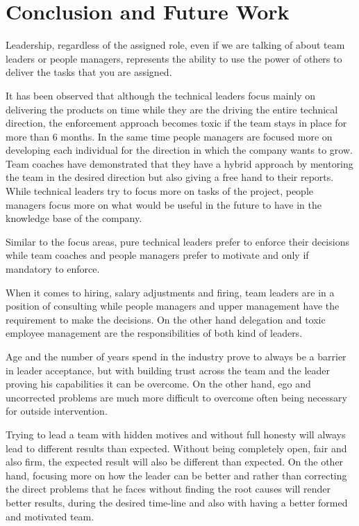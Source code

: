 \chapter{Conclusion and Future Work}
\label{sec:con-fut}

Leadership, regardless of the assigned role, even if we are talking of about team leaders or people managers, represents the ability to use the power of others to deliver the tasks that you are assigned. 

It has been observed that although the technical leaders focus mainly on delivering the products on time while they are the driving the entire technical direction, the enforcement approach becomes toxic if the team stays in place for more than 6 months. In the same time people managers are focused more on developing each individual for the direction in which the company wants to grow. Team coaches have demonstrated that they have a hybrid approach by mentoring the team in the desired direction but also giving a free hand to their reports. While technical leaders try to focus more on tasks of the project, people managers focus more on what would be useful in the future to have in the knowledge base of the company.

Similar to the focus areas, pure technical leaders prefer to enforce their decisions while team coaches and people managers prefer to motivate and only if mandatory to enforce.

When it comes to hiring, salary adjustments and firing, team leaders are in a position of consulting while people managers and upper management have the requirement to make the decisions. On the other hand delegation and toxic employee management are the responsibilities of both kind of leaders.

Age and the number of years spend in the industry prove to always be a barrier in leader acceptance, but with building trust across the team and the leader proving his capabilities it can be overcome. On the other hand, ego and uncorrected problems are much more difficult to overcome often being necessary for outside intervention.

Trying to lead a team with hidden motives and without full honesty will always lead to different results than expected. Without being completely open, fair and also firm, the expected result will also be different than expected. On the other hand, focusing more on how the leader can be better and rather than correcting the direct problems that he faces without finding the root causes will render better results, during the desired time-line and also with having a better formed and motivated team.

